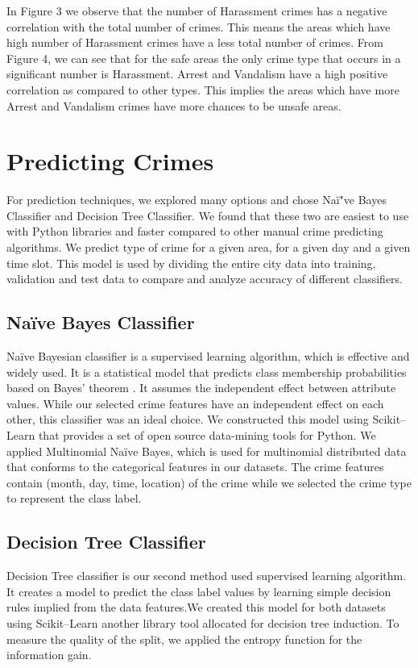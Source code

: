 \documentclass[journal, a4paper]{IEEEtran}
\begin{document}
In Figure 3 we observe that the number of Harassment crimes has a negative correlation with the total number of crimes. This means the areas which have high number of Harassment crimes have a less total number of crimes.
From Figure 4, we can see that for the safe areas the only crime type that occurs in a significant number is Harassment.
Arrest and Vandalism have a high positive correlation as compared to other types. This implies the areas which have more Arrest and Vandalism crimes have more chances to be unsafe areas. 


\section{Predicting Crimes}
For prediction techniques, we explored many options and chose Na{\"i"}ve Bayes Classifier and Decision Tree Classifier. We found that these two are easiest to use with Python libraries and faster compared to other manual crime predicting algorithms. We predict type of crime for a given area, for a given day and a given time slot. This model is used by dividing the entire city data into training, validation and test data to compare and analyze accuracy of different classifiers.
\subsection{Na{\"i}ve Bayes Classifier}
Naïve Bayesian classifier is a supervised learning algorithm, which is effective and widely used. It is a statistical model that predicts class membership probabilities based on Bayes’ theorem
. It assumes the independent effect between attribute values. While our selected crime
features have an independent effect on each other, this classifier was an ideal choice.
We constructed this model using Scikit–Learn that provides a set of open source data-mining
tools for Python. We applied Multinomial Na{\"i}ve Bayes, which is used for multinomial distributed
data that conforms to the categorical features in our datasets. The crime features contain (month,
day, time, location) of the crime while we selected the crime type to represent the class label.
\subsection{Decision Tree Classifier}
Decision Tree classifier is our second method used supervised learning algorithm. It creates a model to
predict the class label values by learning simple decision rules implied from the data features.We created this model for both datasets using Scikit–Learn another library tool allocated for
decision tree induction. To measure the quality of the split, we applied the entropy function for
the information gain.
\end{document}
